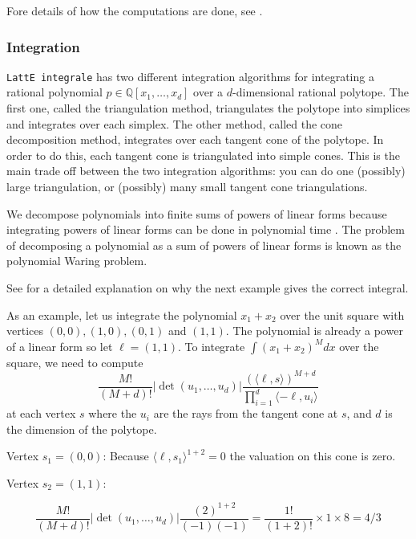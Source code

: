 \documentclass{article}
\newcommand{\Q}{{\mathbb Q}}
\newcommand{\latteInt}{{\tt LattE integrale}\xspace}
\begin{document}
Fore details of how the computations are done, see \cite{koeppe:irrational-barvinok, latte1} .

\subsubsection{Integration}

\latteInt has two different integration algorithms for integrating a rational polynomial $p \in \Q[x_1, \dots, x_d]$ over a $d$-dimensional rational polytope. The first one, called the triangulation method, triangulates the polytope into simplices and integrates over each simplex. The other method, called the cone decomposition method, integrates over each tangent cone of the polytope. In order to do this, each tangent cone is triangulated into simple cones. This is the main trade off between the two integration algorithms: you can do one (possibly) large triangulation, or (possibly) many small tangent cone triangulations. 

We decompose polynomials into finite sums of powers of linear forms because
integrating powers of linear forms can be done in polynomial time
\cite{howToIntegratePolynomialSimplex}. The problem of decomposing a
polynomial as a sum of powers of linear forms is known as the polynomial
Waring problem. 

See \cite{latte-integrale-paper} for a detailed explanation on why the next example gives the correct integral. 

As an example, let us integrate the polynomial $x_1+x_2$ over the unit square with vertices $(0,0), (1,0), (0,1)$ and $(1,1)$. The polynomial is already a power of a linear form so let $\ell = (1,1)$. To integrate $\int (x_1+x_2)^M dx$ over the square, we need to compute
\begin{displaymath}
	\frac{M!}{(M+d)!} |\det(u_1, \dots, u_d)| \frac{(\langle \ell, s \rangle)^{M+d}}{\prod_{i=1}^d  \langle -\ell, u_i \rangle}
\end{displaymath}
at each vertex $s$ where the $u_i$ are the rays from the tangent cone at $s$, and $d$ is the dimension of the polytope.

Vertex $s_1 = (0,0)$: Because $\langle \ell, s_1 \rangle ^{1+2} = 0$ the valuation on this cone is zero.

Vertex $s_2 = (1,1)$: 

\begin{displaymath}
 \frac{M!}{(M+d)!} |\det(u_1, \dots, u_d)| \frac{(2)^{1+2}}{(-1)(-1)} = \frac{1!}{(1+2)!} \times 1 \times 8 = 4/3
\end{displaymath}
\end{document}
